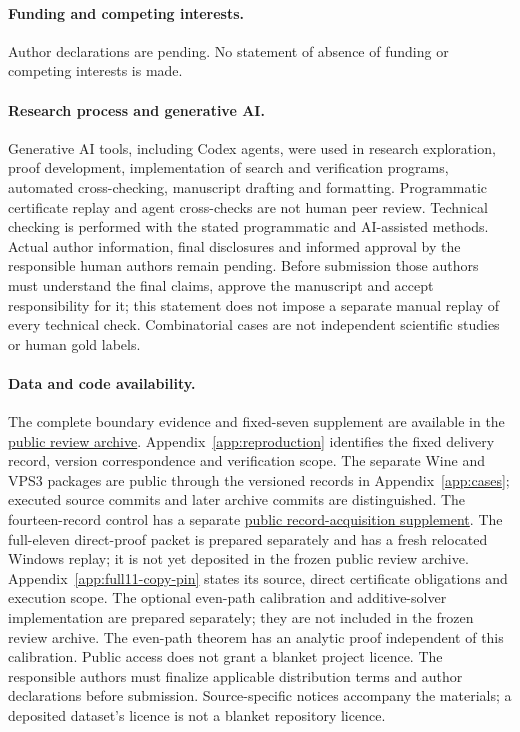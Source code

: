 \documentclass[pdflatex,sn-mathphys-num]{sn-jnl}
\theoremstyle{thmstyleone}
\theoremstyle{thmstylethree}
\theoremstyle{thmstyletwo}
\begin{document}
\paragraph*{Funding and competing interests.}
Author declarations are pending. No statement of absence of funding or competing interests is made.
\paragraph*{Research process and generative AI.}
Generative AI tools, including Codex agents, were used in research exploration, proof development, implementation of search and verification programs, automated cross-checking, manuscript drafting and formatting. Programmatic certificate replay and agent cross-checks are not human peer review. Technical checking is performed with the stated programmatic and AI-assisted methods. Actual author information, final disclosures and informed approval by the responsible human authors remain pending. Before submission those authors must understand the final claims, approve the manuscript and accept responsibility for it; this statement does not impose a separate manual replay of every technical check. Combinatorial cases are not independent scientific studies or human gold labels.
\paragraph*{Data and code availability.}
The complete boundary evidence and fixed-seven supplement are available in the \href{https://github.com/SHiJiE1115/newproj/releases/tag/complete-six-review-20261011-v01}{public review archive}. Appendix~\ref{app:reproduction} identifies the fixed delivery record, version correspondence and verification scope. The separate Wine and VPS3 packages are public through the versioned records in Appendix~\ref{app:cases}; executed source commits and later archive commits are distinguished. The fourteen-record control has a separate \href{https://github.com/SHiJiE1115/newproj/tree/78da45ebeff7e74d0cb080114f30172fac3f09f8/theory/record_acquisition_v01}{public record-acquisition supplement}. The full-eleven direct-proof packet is prepared separately and has a fresh relocated Windows replay; it is not yet deposited in the frozen public review archive. Appendix~\ref{app:full11-copy-pin} states its source, direct certificate obligations and execution scope. The optional even-path calibration and additive-solver implementation are prepared separately; they are not included in the frozen review archive. The even-path theorem has an analytic proof independent of this calibration. Public access does not grant a blanket project licence. The responsible authors must finalize applicable distribution terms and author declarations before submission. Source-specific notices accompany the materials; a deposited dataset's licence is not a blanket repository licence.
\end{document}
